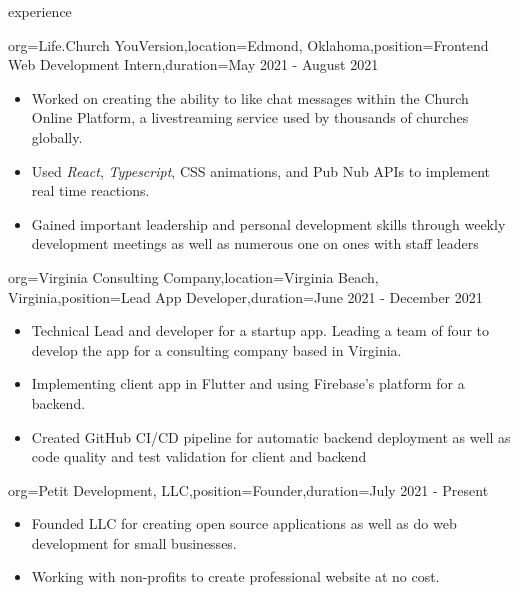 \documentclass{resume}
\begin{document}
\begin{ResumeSection}{experience}
    \begin{ResumeSubsection}{org={Life.Church YouVersion},location={Edmond, Oklahoma},position={Frontend Web Development Intern},duration={May 2021 - August 2021}}
        \begin{itemize}
            \item {Worked on creating the ability to like chat messages within
                    the Church Online Platform, a livestreaming service used by
                thousands of churches globally.}
            \item {Used \textit{React}, \textit{Typescript}, CSS animations, and
                Pub Nub APIs to implement real time reactions.}
            \item Gained important leadership and personal development skills
                through weekly development meetings as well as numerous one on
                ones with staff leaders
        \end{itemize}
    \end{ResumeSubsection}

    \begin{ResumeSubsection}{org={Virginia Consulting Company},location={Virginia Beach, Virginia},position={Lead App Developer},duration={June 2021 - December 2021}}
        \begin{itemize}
            \item {Technical Lead and developer for a startup app. Leading a team of four to develop the app for a consulting company based in Virginia.}
            \item {Implementing client app in Flutter and using Firebase's platform for a backend.}
            \item {Created GitHub CI/CD pipeline for automatic backend deployment as well as code quality and test validation for client and backend}
        \end{itemize}
    \end{ResumeSubsection}

    \begin{ResumeSubsection}{org={Petit Development, LLC},position={Founder},duration={July 2021 - Present}}
        \begin{itemize}
            \item Founded LLC for creating open source applications as well as
                do web development for small businesses.
            \item Working with non-profits to create professional website at no cost.
        \end{itemize}
    \end{ResumeSubsection}


\end{ResumeSection}
\end{document}
